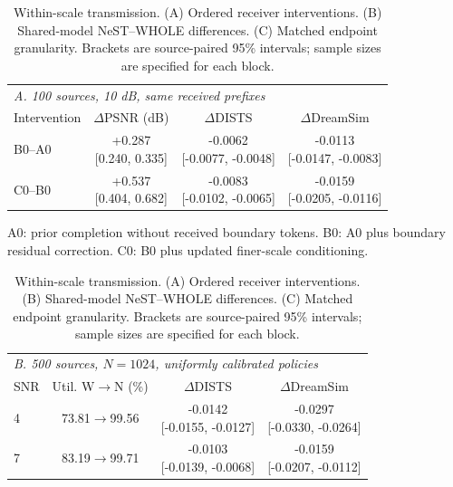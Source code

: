 \begin{table}[t]
\caption{Within-scale transmission. (A) Ordered receiver interventions. (B) Shared-model NeST--WHOLE differences. (C) Matched endpoint granularity. Brackets are source-paired 95\% intervals; sample sizes are specified for each block.}
\label{tab:internal}\centering\footnotesize
\setlength{\tabcolsep}{2.1pt}\renewcommand{\arraystretch}{1.05}
\begin{tabular}{@{}lccc@{}}\toprule
\multicolumn{4}{l}{\textit{A. 100 sources, 10 dB, same received prefixes}}\\
Intervention & $\Delta$PSNR (dB) & $\Delta$DISTS & $\Delta$DreamSim\\
\midrule
B0--A0 & \shortstack{+0.287\\{}[0.240, 0.335]} & \shortstack{-0.0062\\{}[-0.0077, -0.0048]} & \shortstack{-0.0113\\{}[-0.0147, -0.0083]}\\[2pt]
C0--B0 & \shortstack{+0.537\\{}[0.404, 0.682]} & \shortstack{-0.0083\\{}[-0.0102, -0.0065]} & \shortstack{-0.0159\\{}[-0.0205, -0.0116]}\\[2pt]
\bottomrule\end{tabular}
\par\smallskip
\begin{minipage}{\ifCLASSOPTIONonecolumn 3.4in\else\columnwidth\fi}\scriptsize
A0: prior completion without received boundary tokens. B0: A0 plus boundary residual correction. C0: B0 plus updated finer-scale conditioning.
\end{minipage}
\par\smallskip
\begin{tabular}{@{}lccc@{}}\toprule
\multicolumn{4}{l}{\textit{B. 500 sources, $N=1024$, uniformly calibrated policies}}\\
SNR & Util. W$\to$N (\%) & $\Delta$DISTS & $\Delta$DreamSim\\
\midrule
4 & 73.81$\to$99.56 & \shortstack{-0.0142\\{}[-0.0155, -0.0127]} & \shortstack{-0.0297\\{}[-0.0330, -0.0264]}\\[2pt]
7 & 83.19$\to$99.71 & \shortstack{-0.0103\\{}[-0.0139, -0.0068]} & \shortstack{-0.0159\\{}[-0.0207, -0.0112]}\\[2pt]

\end{tabular}
\end{table}
